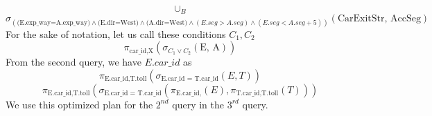 $$\cup_B$$
$$\sigma_{ (\text{(E.exp\_way=A.exp\_way)} \land \text{(E.dir=West)} \land \text{(A.dir=West)} \land (E.seg > A.seg) \land (E.seg < A.seg + 5) )}(\text{CarExitStr, AccSeg})$$
For the sake of notation, let us call these conditions $C_1,C_2$
$$\pi_{\text{car\_id,X}}(\sigma_{C_1\lor C_2}(\text{E, A}))$$
From the second query, we have  $E.car\_id$ as
$$\pi_{\text{E.car\_id,T.toll}}(\sigma_{\text{E.car\_id = T.car\_id}}(E,T))$$
$$\pi_{\text{E.car\_id,T.toll}}(\sigma_{\text{E.car\_id = T.car\_id}}(\pi_{\text{E.car\_id,}}(E),\pi_{\text{T.car\_id,T.toll}}(T)))$$
We use this optimized plan for the $2^{nd}$ query in the $3^{rd}$ query.
\begin{comment}

$$(\text{E.exp\_way=A.exp\_way}\land \text{E.dir=East}\land \text{A.dir=EAST}\land \text{E.seg<A.seg} \land \text{E.seg>A.seg-5})}$$




\section{Optimization Specifications}
A first attempt at making a DQN we might narrow down to the fact that DQN will be query specific, we do not know the exact state we will be in nor do we know the exact reward we get until we do the action. 
\par The interesting part of this problem only arises due to complex queries, hence we need to remember that when choosing a query to solve, operations like join, Aggregation, duplication elemination and more result in complex queries generally.
\par Window size kept for training can change and a good window size needs to be figured out.
\par The underlying algorithms for joins, memory access and message passing should be fixed so results aren't affected by multiple attributes.
\par Need to encode the query and convert it into features for the DQN.
\par To determine what all should the features should capture, we need to look at the operations we will be performing, we also need an encoding for the query itself as well as the notations used in the previous chapter to calculate complexity.
\begin{itemize}
\item $B(R) \coloneqq$ is the number of blocks needed to hold all the tuples of relation $R$.
\item $T(R) \coloneqq$ is the number of tuples of relation $R$.
\item $V(R,a) \coloneqq$ is the value count for attribute a of relation $R$, that is, the number of distinct values relation $R$ has in attribute $a$.
\item $V(R, [ a_1 , a_2,..., a_n]) \coloneqq$ is the number of distinct values $R$ has when all of attributes $a_1, a_2,..., a_n$ are considered together, that is, the number of tuples in $\delta(\pi_{a_1,a_2,...,a_n}(R))$
\end{itemize}


\end{comment}
